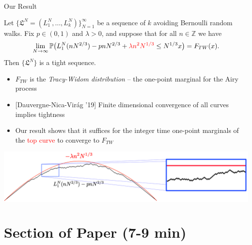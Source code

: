 \documentclass[9pt,t,dvipsnames]{beamer}
\begin{document}
\begin{frame}{Our Result}
\small{\begin{theorem}[DFFSTWZ] Let $\{\mathfrak{L}^N = (L_1^N,\dots,L_k^N)\}_{N=1}^\infty$ be a sequence of $k$ avoiding Bernoulli random walks. Fix $p\in(0,1)$ and $\lambda > 0$, and suppose that for all $n\in\mathbb{Z}$ we have
\[
\lim_{N\to\infty} \mathbb{P}\big(L_1^{N}(nN^{2/3}) - pnN^{2/3} + \textcolor{red}{\lambda n^2 N^{1/3}} \leq N^{1/3} x \big) = F_{TW}(x).
\]
Then $\{\mathfrak{L}^N\}$ is a tight sequence.
\end{theorem}}

\begin{itemize}
	\item $F_{TW}$ is the \textit{Tracy-Widom distribution} -- the one-point marginal for the Airy process
	
	\item {[Dauvergne-Nica-Vir\'{a}g '19]} Finite dimensional convergence of all curves implies tightness
	
	\item Our result shows that it suffices for the integer time one-point marginals of the \textcolor{red}{top curve} to converge to $F_{TW}$
\end{itemize}
\begin{center}
	\includegraphics[width=\textwidth]{graphics/ConvToTW.png}
\end{center}
\end{frame}


\section{Section of Paper (7-9 min)}
\end{document}
